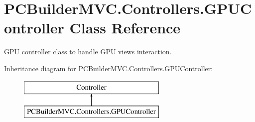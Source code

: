 \hypertarget{class_p_c_builder_m_v_c_1_1_controllers_1_1_g_p_u_controller}{}\section{P\+C\+Builder\+M\+V\+C.\+Controllers.\+G\+P\+U\+Controller Class Reference}
\label{class_p_c_builder_m_v_c_1_1_controllers_1_1_g_p_u_controller}


G\+PU controller class to handle G\+PU views interaction.  


Inheritance diagram for P\+C\+Builder\+M\+V\+C.\+Controllers.\+G\+P\+U\+Controller\+:\begin{figure}[H]
\begin{center}
\leavevmode
\includegraphics[height=2.000000cm]{class_p_c_builder_m_v_c_1_1_controllers_1_1_g_p_u_controller}
\end{center}
\end{figure}
